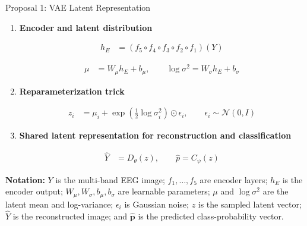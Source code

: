 \documentclass[aspectratio=169]{beamer}
\let\oldcite\cite
\renewcommand{\cite}[1]{{\tiny\oldcite{#1}}}
\begin{document}
\begin{frame}{Proposal 1: VAE Latent Representation}
\scriptsize
\setlength{\abovedisplayskip}{2pt}
\setlength{\belowdisplayskip}{2pt}
\setlength{\jot}{2pt}

\begin{enumerate}

    \item \textbf{Encoder and latent distribution}
    {\scriptsize \cite{kingma2014autoencoding}}

    \begin{align*}
    h_E
    &=
    (f_5\circ f_4\circ f_3\circ f_2\circ f_1)(Y)
    \end{align*}

    \begin{align*}
    \mu
    &=
    W_{\mu}h_E+b_{\mu},
    \qquad
    \log\sigma^2
    =
    W_{\sigma}h_E+b_{\sigma}
    \end{align*}


    \item \textbf{Reparameterization trick}
    {\scriptsize \cite{kingma2014autoencoding}}

    \begin{align*}
    z_i
    &=
    \mu_i+
    \exp\left(
    \frac{1}{2}\log\sigma_i^2
    \right)
    \odot \epsilon_i,
    \qquad
    \epsilon_i\sim\mathcal{N}(0,I)
    \end{align*}

    \item \textbf{Shared latent representation for reconstruction and classification}

    \begin{align*}
    \hat{Y}
    &=
    D_{\theta}(z),
    \qquad
    \hat{p}
    =
    C_{\psi}(z)
    \end{align*}

\end{enumerate}

{\scriptsize
\textbf{Notation:} $Y$ is the multi-band EEG image; $f_1,\ldots,f_5$ are encoder layers; $h_E$ is the encoder output; $W_{\mu},W_{\sigma},b_{\mu},b_{\sigma}$ are learnable parameters; $\mu$ and $\log\sigma^2$ are the latent mean and log-variance; $\epsilon_i$ is Gaussian noise; $z$ is the sampled latent vector; $\hat{Y}$ is the reconstructed image; and $\hat{\mathbf{p}}$ is the predicted class-probability vector. }

\end{frame}
\end{document}
